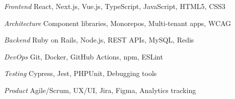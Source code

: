 \begin{minipage}[t]{0.55\textwidth}
\begin{cvskills}



 \cvskill
    {\textit{Frontend}} %
    {React, Next.js, Vue.js, TypeScript, JavaScript, HTML5, CSS3} %


  \cvskill
    {\textit{Architecture}} %
    {Component libraries, Monorepos, Multi-tenant apps, WCAG} %


  \cvskill
    {\textit{Backend}} %
    {Ruby on Rails, Node.js, REST APIs, MySQL, Redis} %

 
\end{cvskills}
\end{minipage}%
\begin{minipage}[t]{0.45\textwidth}
\begin{cvskills}

  \cvskill
    {\textit{DevOps}} %
    {Git, Docker, GitHub Actions, npm, ESLint} %


  \cvskill
    {\textit{Testing}} %
    {Cypress, Jest, PHPUnit, Debugging tools} %


  \cvskill
    {\textit{Product}} %
    {Agile/Scrum, UX/UI, Jira, Figma, Analytics tracking} %

\end{cvskills}
\end{minipage}

%

%